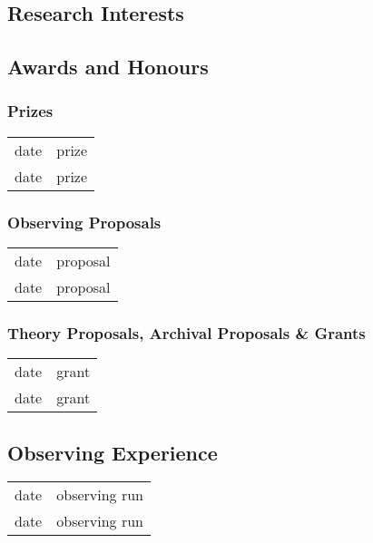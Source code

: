 

\subsection{Research Interests}



\subsection{Awards and Honours}

\subsubsection{Prizes}

\begin{tabular}{rl}
    date & prize \\
    date & prize \\
\end{tabular}

\subsubsection{Observing Proposals}

\begin{tabular}{rl}
    date & proposal \\
    date & proposal \\
\end{tabular}

\subsubsection{Theory Proposals, Archival Proposals \& Grants}

\begin{tabular}{rl}
    date & grant \\
    date & grant \\
\end{tabular}



\subsection{Observing Experience}

\begin{tabular}{rl}
    date & observing run \\
    date & observing run \\
\end{tabular}


